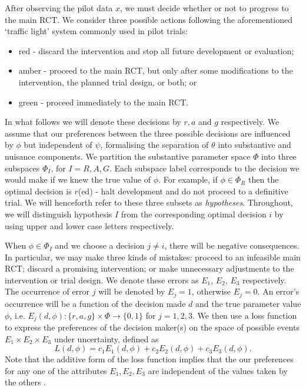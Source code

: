 \documentclass[AMA,STIX1COL]{WileyNJD-v2}
\begin{document}
After observing the pilot data $x$, we must decide whether or not to progress to the main RCT. We consider three possible actions following the aforementioned `traffic light' system commonly used in pilot trials: 
\begin{itemize}
\item red - discard the intervention and stop all future development or evaluation; 
\item amber - proceed to the main RCT, but only after some modifications to the intervention, the planned trial design, or both; or
\item green - proceed immediately to the main RCT.
\end{itemize}

In what follows we will denote these decisions by $r, a$ and $g$ respectively. We assume that our preferences between the three possible decisions are influenced by $\phi$ but independent of $\psi$, formalising the separation of $\theta$ into substantive and nuisance components. We partition the substantive parameter space $\Phi$ into three subspaces $\Phi_I$, for $I=R,A,G$. Each subspace label corresponds to the decision we would make if we knew the true value of $\phi$. For example, if $\phi \in \Phi_R$ then the optimal decision is $r$(ed) - halt development and do not proceed to a definitive trial. We will henceforth refer to these three subsets as \emph{hypotheses}. Throughout, we will distinguish hypothesis $I$ from the corresponding optimal decision $i$ by using upper and lower case letters respectively.

When $\phi \in \Phi_{I}$ and we choose a decision $j \neq i$, there will be negative consequences. In particular, we may make three kinds of mistakes: proceed to an infeasible main RCT; discard a promising intervention; or make unnecessary adjustments to the intervention or trial design. We denote these errors as $E_1$, $E_2$, $E_3$ respectively. The occurrence of error $j$ will be denoted by $E_j = 1$, otherwise $E_j = 0$. An error's occurrence will be a function of the decision made $d$ and the true parameter value $\phi$, i.e. $E_j(d, \phi): \{r, a, g\} \times \Phi \rightarrow \{0,1\}$ for $j = 1,2,3$. We then use a loss function to express the preferences of the decision maker(s) on the space of possible events $E_1 \times E_2 \times E_3$ under uncertainty, defined as
$$
L(d, \phi) = c_1 E_1(d, \phi) + c_2 E_2(d, \phi) + c_3 E_3(d, \phi).
$$
Note that the additive form of the loss function implies that the our preferences for any one of the attributes $E_1, E_2, E_3$ are independent of the values taken by the others \cite{French2000}. 
\end{document}
